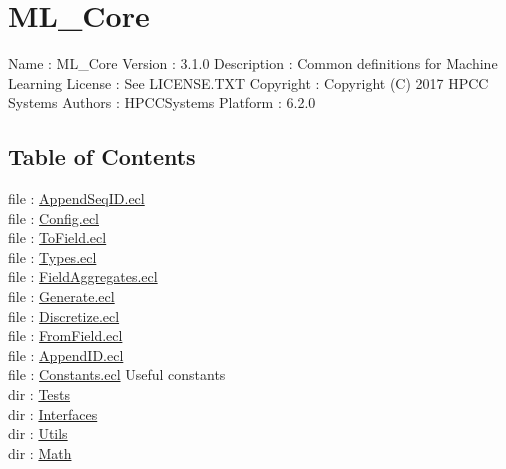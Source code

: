 \chapter*{ML\_Core}
\hypertarget{ML_Core}{}

Name : ML\_Core
Version : 3.1.0
Description : Common definitions for Machine Learning
License : See LICENSE.TXT
Copyright : Copyright (C) 2017 HPCC Systems
Authors : HPCCSystems
Platform : 6.2.0

\section*{Table of Contents}
file : \hyperlink{ML_Core.AppendSeqID}{AppendSeqID.ecl}   \\
file : \hyperlink{ML_Core.Config}{Config.ecl}   \\
file : \hyperlink{ML_Core.ToField}{ToField.ecl}   \\
file : \hyperlink{ML_Core.Types}{Types.ecl}   \\
file : \hyperlink{ML_Core.FieldAggregates}{FieldAggregates.ecl}   \\
file : \hyperlink{ML_Core.Generate}{Generate.ecl}   \\
file : \hyperlink{ML_Core.Discretize}{Discretize.ecl}   \\
file : \hyperlink{ML_Core.FromField}{FromField.ecl}   \\
file : \hyperlink{ML_Core.AppendID}{AppendID.ecl}   \\
file : \hyperlink{ML_Core.Constants}{Constants.ecl}  Useful constants \\
dir : \hyperlink{ML_Core/Tests}{Tests}   \\
dir : \hyperlink{ML_Core/Interfaces}{Interfaces}   \\
dir : \hyperlink{ML_Core/Utils}{Utils}   \\
dir : \hyperlink{ML_Core/Math}{Math}   \\















